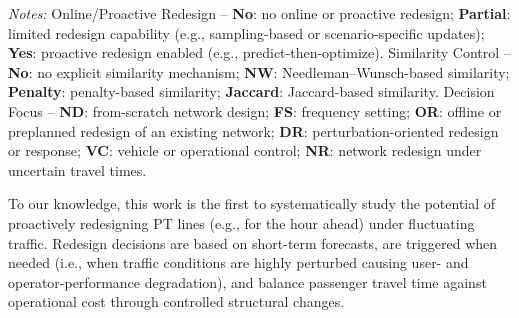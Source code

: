 \documentclass[a4paper,fleqn]{cas-sc}
\begin{document}
\begin{table}[pos=htbp]
\begin{threeparttable}
\vspace{2pt}
\parbox{\textwidth}{\footnotesize
\textit{Notes:} Online/Proactive Redesign -- \textbf{No}: no online or proactive redesign; \textbf{Partial}: limited redesign capability (e.g., sampling-based or scenario-specific updates); \textbf{Yes}: proactive redesign enabled (e.g., predict-then-optimize).
Similarity Control -- \textbf{No}: no explicit similarity mechanism; \textbf{NW}: Needleman--Wunsch-based similarity; \textbf{Penalty}: penalty-based similarity; \textbf{Jaccard}: Jaccard-based similarity.
Decision Focus -- \textbf{ND}: from-scratch network design; \textbf{FS}: frequency setting; \textbf{OR}: offline or preplanned redesign of an existing network; \textbf{DR}: perturbation-oriented redesign or response; \textbf{VC}: vehicle or operational control; \textbf{NR}: network redesign under uncertain travel times.
}

\caption{Comparative analysis of public transport optimization approaches across decision scope, online/proactive redesign capability, and similarity control mechanisms.}
\label{tab:innovation_matrix}
\end{threeparttable}
\end{table}


To our knowledge, this work is the first to systematically study the potential of proactively redesigning PT lines (e.g., for the hour ahead) under fluctuating traffic. Redesign decisions are based on short-term forecasts, are triggered when needed (i.e., when traffic conditions are highly perturbed causing user- and operator-performance degradation), and balance passenger travel time against operational cost through controlled structural changes.

\end{document}
